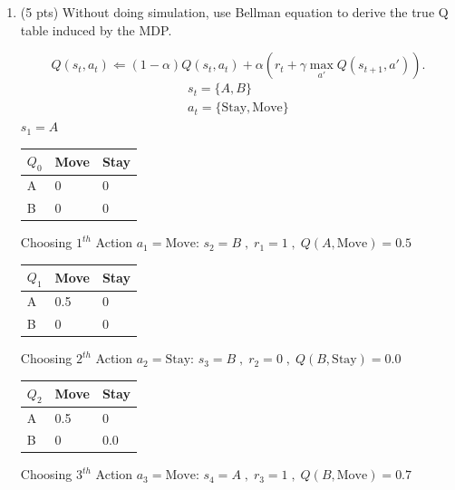 \documentclass[a4paper]{article}
\theoremstyle{definition}
\newenvironment{soln}{
    \leavevmode\color{blue}\ignorespaces
}{}
\begin{document}
\begin{enumerate}
\item (5 pts) Without doing simulation, use Bellman equation to derive the true Q table induced by the MDP.
\begin{soln}
    $$Q(s_t, a_t) \Leftarrow (1-\alpha) Q(s_t, a_t) + \alpha \left( r_t + \gamma \max_{a'} Q(s_{t+1}, a') \right).$$
    \begin{gather*}
        s_t=\{A,B\} \\
        a_t=\{\text{Stay},\text{Move}\}
    \end{gather*}
    $s_1=A$
    \begin{center}
        \begin{tabular}{ | m{5em} | m{5em}| m{5em} |} 
          \hline
          $Q_0$ & Move & Stay \\ 
          \hline
          A & 0 & 0  \\ 
          \hline
          B & 0 & 0\\ 
          \hline
        \end{tabular}
    \end{center}
    Choosing $1^{th}$ Action $a_{1} = \text{Move}$: $s_{2}=B\;,\;r_{1}=1\;,\;Q(A,\text{Move}) = 0.5$
        \begin{center}
            \begin{tabular}{ | m{5em} | m{5em}| m{5em} |} 
            \hline
            $Q_{1}$ & Move & Stay \\ 
            \hline
            A & 0.5 & 0  \\
            \hline
            B & 0 & 0 \\ 
            \hline
            \end{tabular}
        \end{center}
Choosing $2^{th}$ Action $a_{2} = \text{Stay}$: $s_{3}=B\;,\;r_{2}=0\;,\;Q(B,\text{Stay}) = 0.0$
        \begin{center}
            \begin{tabular}{ | m{5em} | m{5em}| m{5em} |} 
            \hline
            $Q_{2}$ & Move & Stay \\ 
            \hline
            A & 0.5 & 0  \\
            \hline
            B & 0 & 0.0 \\ 
            \hline
            \end{tabular}
        \end{center}
Choosing $3^{th}$ Action $a_{3} = \text{Move}$: $s_{4}=A\;,\;r_{3}=1\;,\;Q(B,\text{Move}) = 0.7$
        \begin{center}

\end{center}
\end{soln}
\end{enumerate}
\end{document}
